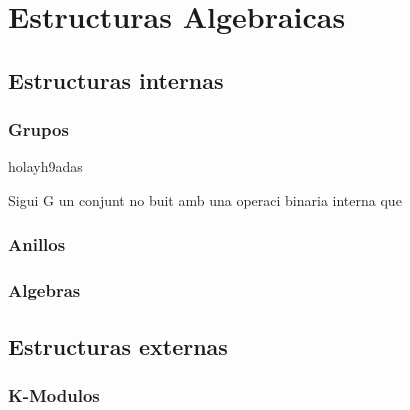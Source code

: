 \chapter{Estructuras Algebraicas}

\section{Estructuras internas}

\subsection{Grupos}
\label{ss_groups}

\begin{theorem}
 holayh9adas
\end{theorem}


Sigui G un conjunt no buit amb una operaci binaria interna que 

\subsection{Anillos}
\label{}



\subsection{Algebras}
\label{}


\section{Estructuras externas}

\subsection{K-Modulos}



